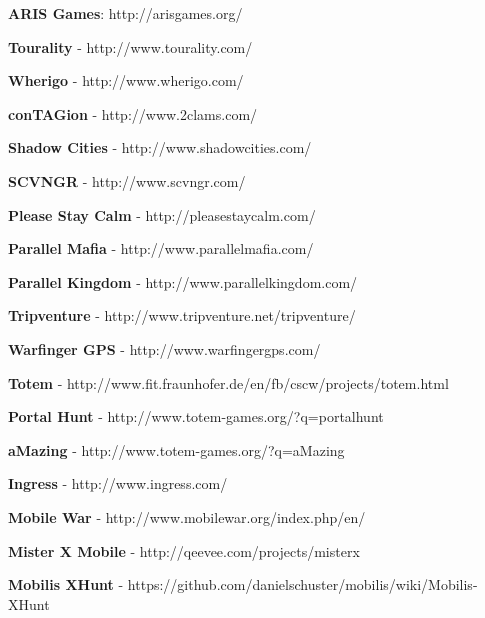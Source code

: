 \documentclass{article}
\begin{document}
\textbf{ARIS Games}: http://arisgames.org/ \newline

\textbf{Tourality} - http://www.tourality.com/ \newline

\textbf{Wherigo} - http://www.wherigo.com/ \newline

\textbf{conTAGion} - http://www.2clams.com/ \newline

\textbf{Shadow Cities} - http://www.shadowcities.com/ \newline

\textbf{SCVNGR} - http://www.scvngr.com/ \newline

\textbf{Please Stay Calm} - http://pleasestaycalm.com/ \newline

\textbf{Parallel Mafia} - http://www.parallelmafia.com/ \newline

\textbf{Parallel Kingdom} - http://www.parallelkingdom.com/ \newline

\textbf{Tripventure} - http://www.tripventure.net/tripventure/ \newline

\textbf{Warfinger GPS} - http://www.warfingergps.com/ \newline

\textbf{Totem} - http://www.fit.fraunhofer.de/en/fb/cscw/projects/totem.html
\newline

\textbf{Portal Hunt} - http://www.totem-games.org/?q=portalhunt \newline

\textbf{aMazing} - http://www.totem-games.org/?q=aMazing \newline

\textbf{Ingress} - http://www.ingress.com/ \newline

\textbf{Mobile War} - http://www.mobilewar.org/index.php/en/ \newline

\textbf{Mister X Mobile} - http://qeevee.com/projects/misterx \newline

\textbf{Mobilis XHunt} - https://github.com/danielschuster/mobilis/wiki/Mobilis-XHunt
\newline
\end{document}
